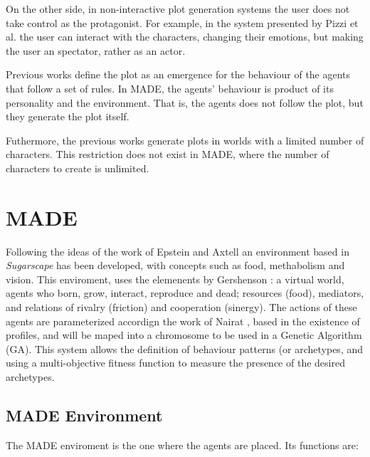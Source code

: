 \documentclass[runningheads]{llncs}
\begin{document}
On the other side, in non-interactive plot generation systems the user does not take control as the protagonist. For example, in the system presented by Pizzi et al. \cite{pizzi2007interactive} the user can interact with the characters, changing their emotions, but making the user an spectator, rather as an actor. %

Previous works define the plot as an emergence for the behaviour of the agents that follow a set of rules. In MADE, the agents' behaviour is product of its personality and the environment. That is, the agents does not follow the plot, but they generate the plot itself. %

Futhermore, the previous works generate plots in worlds with a limited number of characters. This restriction does not exist in MADE, where the number of characters to create is unlimited.


\section{MADE}
\label{sec:made}

Following the ideas of the work of Epstein and Axtell \cite{epstein1996growing} an environment based in {\em Sugarscape} has been developed, with concepts such as food, methabolism and vision. This enviroment, uses the elemenents  by Gershenson \cite{gershenson2005general}: a virtual world, agents who born, grow, interact, reproduce and dead; resources (food), mediators, and relations of rivalry (friction) and cooperation (sinergy). The actions of these agents are parameterized accordign the work of Nairat \cite{nairat2011character}, based in the existence of profiles, and will be maped into a chromosome to be used in a Genetic Algorithm (GA). This system allows the definition of behaviour patterns (or archetypes, and using a multi-objective fitness function to measure the presence of the desired archetypes. %


\subsection{MADE Environment}
The MADE enviroment is the one where the agents are placed. Its functions are:
\end{document}
